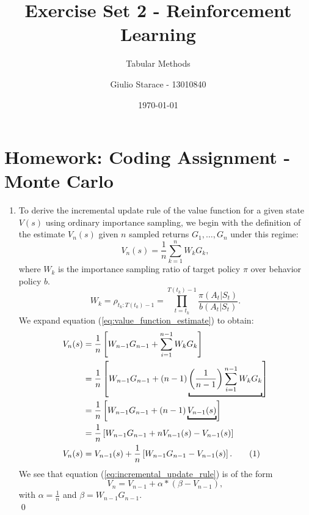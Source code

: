 \documentclass{article}
\title{Exercise Set 2 - Reinforcement Learning}
\subtitle{Tabular Methods}
\author{Giulio Starace - 13010840}
\date{\today}
\newcommand\numberthis{\addtocounter{equation}{1}\tag{\theequation}}
\begin{document}
\maketitle
\section*{Homework: Coding Assignment - Monte Carlo}
\begin{enumerate}
	\item To derive the incremental update rule of the value function for a given state $V(s)$ using
	      ordinary importance sampling, we begin with the definition of the estimate $V_n(s)$ given $n$
	      sampled returns $G_1, \dots, G_n$ under this regime:
	      \begin{equation}\label{eq:value_function_estimate}
		      V_n(s) = \frac{1}{n} \sum^n_{k=1} W_k G_k,
	      \end{equation}
	      where $W_k$ is the importance sampling ratio of target policy $\pi$ over behavior policy $b$.
	      \begin{equation}
		      W_k = \rho_{t_k:T(t_k)-1} = \prod_{t=t_k}^{T(t_k)-1} \frac{\pi(A_t|S_t)}{b(A_t|S_t)}.
	      \end{equation}
	      We expand equation (\ref{eq:value_function_estimate}) to obtain:
	      \begin{align*}
		      V_n(s) & = \frac{1}{n} \left[W_{n-1} G_{n-1} + \sum^{n-1}_{i=1}W_kG_k\right]                \\
		             & = \frac{1}{n} \left[W_{n-1} G_{n-1} +
		      (n-1)\underbracket{\left(\frac{1}{n-1}\right)\sum^{n-1}_{i=1}W_kG_k}\right]                 \\
		             & =  \frac{1}{n} \left[W_{n-1} G_{n-1}+ (n-1)\underbracket{V_{n-1}(s)} \right]       \\
		             & = \frac{1}{n} \left[W_{n-1} G_{n-1}+ n V_{n-1}(s) - V_{n-1}(s)\right]              \\
		      V_n(s) & =  V_{n-1}(s) + \frac{1}{n} \left[W_{n-1} G_{n-1} - V_{n-1}(s)\right]. \numberthis
		      \label{eq:incremental_update_rule}
	      \end{align*}
	      We see that equation (\ref{eq:incremental_update_rule}) is of the form
	      \begin{equation}
		      V_n = V_{n-1} + \alpha * \left(\beta - V_{n-1}\right),
	      \end{equation}
	      with $\alpha = \frac{1}{n}$ and $\beta = W_{n-1} G_{n-1}$.  \\ \qed


\end{enumerate}
\end{document}
